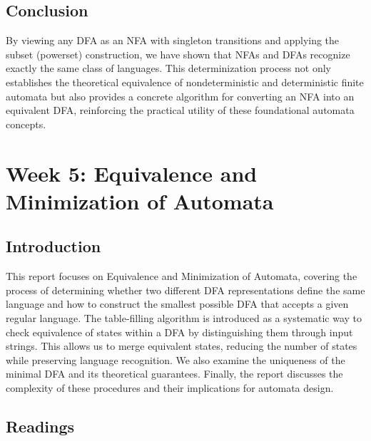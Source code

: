 \documentclass{article}
\theoremstyle{theorem}
\theoremstyle{definition}
\theoremstyle{remark}
\begin{document}
\subsection{Conclusion}
By viewing any DFA as an NFA with singleton transitions and applying the subset (powerset) construction, we have shown that NFAs and DFAs recognize exactly the same class of languages.  This determinization process not only establishes the theoretical equivalence of nondeterministic and deterministic finite automata but also provides a concrete algorithm for converting an NFA into an equivalent DFA, reinforcing the practical utility of these foundational automata concepts.

\newpage

\section{Week 5: Equivalence and Minimization of Automata}

\subsection{Introduction}
This report focuses on Equivalence and Minimization of Automata, covering the process of determining whether two different DFA representations define the same language and how to construct the smallest possible DFA that accepts a given regular language. The table‐filling algorithm is introduced as a systematic way to check equivalence of states within a DFA by distinguishing them through input strings. This allows us to merge equivalent states, reducing the number of states while preserving language recognition. We also examine the uniqueness of the minimal DFA and its theoretical guarantees. Finally, the report discusses the complexity of these procedures and their implications for automata design.

\subsection{Readings}
\end{document}
